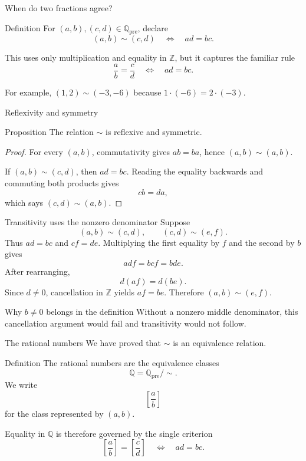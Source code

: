 \documentclass[aspectratio=169,11pt]{beamer}
\newcommand{\Z}{\mathbb Z}
\newcommand{\Q}{\mathbb Q}
\newcommand{\qcl}[2]{\left[\frac{#1}{#2}\right]}
\begin{document}
\begin{frame}{When do two fractions agree?}
  \begin{block}{Definition}
    For \((a,b),(c,d)\in\Q_{\mathrm{pre}}\), declare
    \[
      (a,b)\sim(c,d)
      \quad\Longleftrightarrow\quad
      ad=bc.
    \]
  \end{block}

  This uses only multiplication and equality in \(\Z\), but it captures the
  familiar rule
  \[
    \frac ab=\frac cd
    \quad\Longleftrightarrow\quad ad=bc.
  \]

  For example, \((1,2)\sim(-3,-6)\) because
  \(1\cdot(-6)=2\cdot(-3)\).
\end{frame}

\begin{frame}{Reflexivity and symmetry}
  \begin{block}{Proposition}
    The relation \(\sim\) is reflexive and symmetric.
  \end{block}

  \begin{proof}
    For every \((a,b)\), commutativity gives \(ab=ba\), hence
    \((a,b)\sim(a,b)\).

    If \((a,b)\sim(c,d)\), then \(ad=bc\).  Reading the equality backwards
    and commuting both products gives
    \[
      cb=da,
    \]
    which says \((c,d)\sim(a,b)\).
  \end{proof}
\end{frame}

\begin{frame}{Transitivity uses the nonzero denominator}
  \small
  Suppose
  \[
    (a,b)\sim(c,d),
    \qquad
    (c,d)\sim(e,f).
  \]
  Thus \(ad=bc\) and \(cf=de\).  Multiplying the first equality by \(f\)
  and the second by \(b\) gives
  \[
    adf=bcf=bde.
  \]
  After rearranging,
  \[
    d(af)=d(be).
  \]
  Since \(d\ne0\), cancellation in \(\Z\) yields \(af=be\).  Therefore
  \((a,b)\sim(e,f)\).

  \begin{alertblock}{Why \(b\ne0\) belongs in the definition}
    Without a nonzero middle denominator, this cancellation argument would
    fail and transitivity would not follow.
  \end{alertblock}
\end{frame}

\begin{frame}{The rational numbers}
  We have proved that \(\sim\) is an equivalence relation.

  \begin{block}{Definition}
    The rational numbers are the equivalence classes
    \[
      \boxed{\Q=\Q_{\mathrm{pre}}/{\sim}}.
    \]
    We write
    \[
      \qcl ab
    \]
    for the class represented by \((a,b)\).
  \end{block}

  Equality in \(\Q\) is therefore governed by the single criterion
  \[
    \boxed{\qcl ab=\qcl cd\quad\Longleftrightarrow\quad ad=bc.}
  \]
\end{frame}
\end{document}
